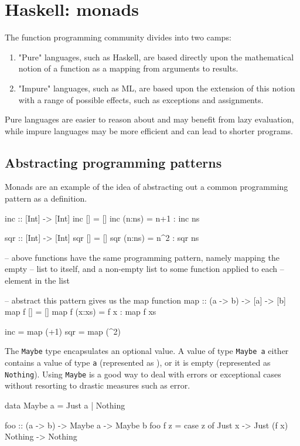 \section{Haskell: monads}
The function programming community divides into two camps:
\begin{enumerate}
	\item "Pure" languages, such as Haskell, are based directly upon the 
	mathematical notion of a function as a mapping from arguments to 
	results.

	\item "Impure" languages, such as ML, are based upon the extension of this notion with a range of possible effects, such as exceptions and assignments.
\end{enumerate}
Pure languages are easier to reason about and may benefit from lazy
evaluation, while impure languages may be more efficient 
and can lead to shorter programs.

\subsection{Abstracting programming patterns}
Monads are an example of the idea of abstracting out a common 
programming pattern as a definition. 

\begin{haskellcode}
inc	       :: [Int] -> [Int]
inc []     =  []
inc (n:ns) =  n+1 : inc ns

sqr	       :: [Int] -> [Int]
sqr []     =  []
sqr (n:ns) =  n^2 : sqr ns

-- above functions have the same programming pattern, namely mapping the empty
-- list to itself, and a non-empty list to some function applied to each
-- element in the list

-- abstract this pattern gives us the map function
map         :: (a -> b) -> [a] -> [b]
map f []     = []
map f (x:xs) = f x : map f xs

inc = map (+1)
sqr = map (^2)
\end{haskellcode}

The \texttt{Maybe} type encapsulates an optional value.
A value of type \texttt{Maybe a} either 
contains a value of type \texttt{a} (represented as ), 
or it is empty 
(represented as \texttt{Nothing}). 
Using \texttt{Maybe} is a good way to deal with errors or 
exceptional cases without resorting to drastic measures such as error.


\begin{haskellcode}
data Maybe a = Just a | Nothing

foo :: (a -> b) -> Maybe a -> Maybe b
foo f z = case z of 
            Just x  -> Just (f x)
            Nothing -> Nothing 
\end{haskellcode}

